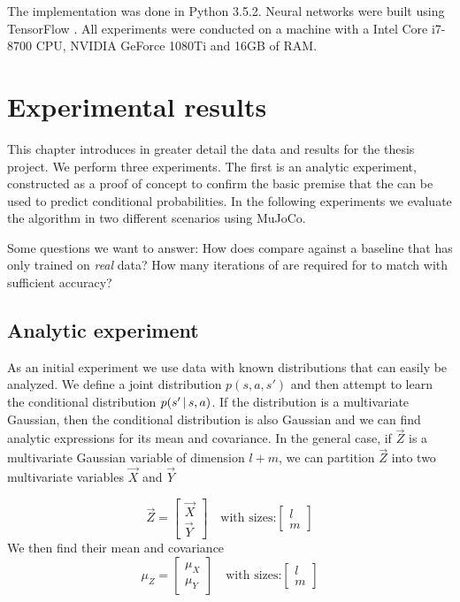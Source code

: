 The implementation was done in Python 3.5.2. Neural networks were built using TensorFlow \parencite{tensorflow2015-whitepaper}. 
All experiments were conducted on a machine with a Intel Core i7-8700 CPU, NVIDIA GeForce 1080Ti and 16GB of RAM.

\chapter{Experimental results}
\label{experiments}

This chapter introduces in greater detail the data and results for the thesis project. We perform three experiments. The first is an analytic experiment, constructed as a proof of concept to confirm the basic premise that the \cvae{} can be used to predict conditional probabilities. In the following experiments we evaluate the \dettostoc{} algorithm in two different scenarios using MuJoCo.

Some questions we want to answer: How does \dettostoc{} compare against a baseline that has only trained on \emph{real} data? How many iterations of \dettostoc{} are required for \fdecoder{} to match \fsimulator{} with sufficient accuracy?


\section{Analytic experiment}
\label{exp:analytic}
As an initial experiment we use data with known distributions that can easily be analyzed. We define a joint distribution $p(s,a,s')$ and then attempt to learn the conditional distribution $p\given{s'}{s,a}$. If the distribution is a multivariate Gaussian, then the conditional distribution is also Gaussian and we can find analytic expressions for its mean and covariance. In the general case, if $\vec{Z}$ is a multivariate Gaussian variable of dimension $l+m$, we can partition $\vec{Z}$ into two multivariate variables $\vec{X}$ and $\vec{Y}$

\begin{equation}
\vec{Z} = 
\begin{bmatrix}
\vec{X} \\
\vec{Y}
\end{bmatrix}
\quad
\text{with sizes:} 
\begin{bmatrix}
l \\
m
\end{bmatrix}
\end{equation}
We then find their mean and covariance
\begin{equation}
\mu_{Z} = 
\begin{bmatrix}
\mu_{X} \\
\mu_{Y}
\end{bmatrix}
\quad
\text{with sizes:} 
\begin{bmatrix}
l \\
m
\end{bmatrix}
\end{equation}

